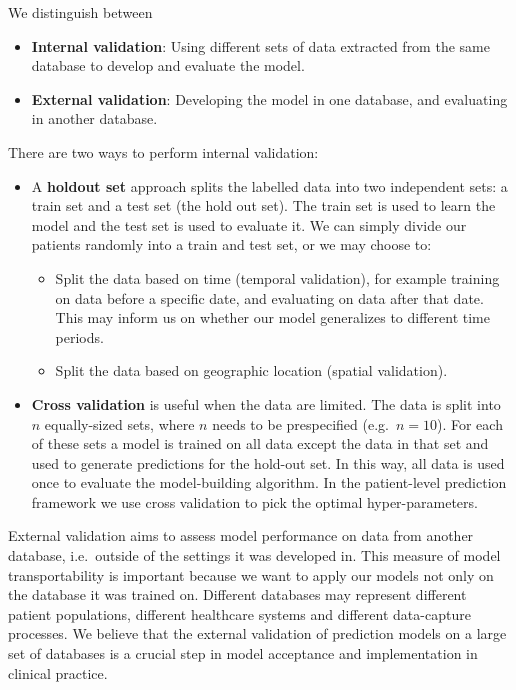 \documentclass[11pt]{book}
\providecommand{\tightlist}{%
  \setlength{\itemsep}{0pt}\setlength{\parskip}{0pt}}
\theoremstyle{definition}
\theoremstyle{definition}
\theoremstyle{definition}
\theoremstyle{remark}
\begin{document}
We distinguish between

\begin{itemize}
\tightlist
\item
  \textbf{Internal validation}: Using different sets of data extracted from the same database to develop and evaluate the model.
\item
  \textbf{External validation}: Developing the model in one database, and evaluating in another database.  
\end{itemize}

There are two ways to perform internal validation:

\begin{itemize}
\tightlist
\item
  A \textbf{holdout set} approach splits the labelled data into two independent sets: a train set and a test set (the hold out set). The train set is used to learn the model and the test set is used to evaluate it. We can simply divide our patients randomly into a train and test set, or we may choose to:

  \begin{itemize}
  \tightlist
  \item
    Split the data based on time (temporal validation), for example training on data before a specific date, and evaluating on data after that date. This may inform us on whether our model generalizes to different time periods.
  \item
    Split the data based on geographic location (spatial validation).  
  \end{itemize}
\item
  \textbf{Cross validation} is useful when the data are limited. The data is split into \(n\) equally-sized sets, where \(n\) needs to be prespecified (e.g.~\(n=10\)). For each of these sets a model is trained on all data except the data in that set and used to generate predictions for the hold-out set. In this way, all data is used once to evaluate the model-building algorithm. In the patient-level prediction framework we use cross validation to pick the optimal hyper-parameters. 
\end{itemize}

External validation aims to assess model performance on data from another database, i.e.~outside of the settings it was developed in. This measure of model transportability is important because we want to apply our models not only on the database it was trained on. Different databases may represent different patient populations, different healthcare systems and different data-capture processes. We believe that the external validation of prediction models on a large set of databases is a crucial step in model acceptance and implementation in clinical practice.
\end{document}
